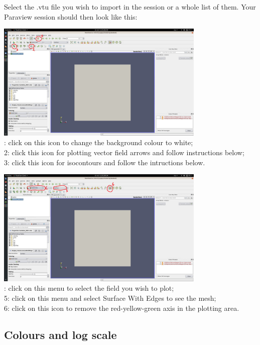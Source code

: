 Select the .vtu file you wish to import in the session or a whole list of them. 
Your Paraview session should then look like this:
 
\begin{center}
\includegraphics[width=10cm]{images/paraview/p3}\\
{: click on this icon to change the background colour to white;\\
2: click this icon for plotting vector field arrows and follow instructions below;\\
3: click this icon for isocontours and follow the intructions below.\\}
\end{center}


\begin{center}
\includegraphics[width=10cm]{images/paraview/p4}\\
{: click on this menu to select the field you wish to plot;\\
5: click on this menu and select Surface With Edges to see the mesh;\\
6: click on this icon to remove the red-yellow-green axis in the plotting area.\\}
\end{center}



\subsection*{Colours and log scale}

